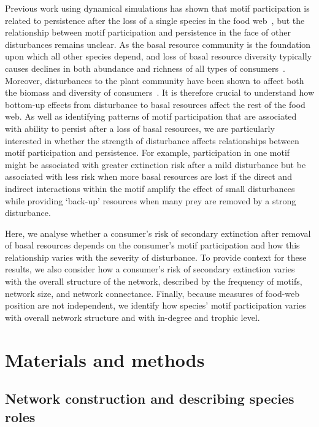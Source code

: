 \documentclass[12pt]{article}
\begin{document}
\begin{spacing}{2.0}
    Previous work using dynamical simulations has shown that motif participation is related to persistence after the loss of a single species in the food web~\citep{Cirtwill2022Oikos}, but the relationship between motif participation and persistence in the face of other disturbances remains unclear.
   As the basal resource community is the foundation upon which all other species depend, and loss of basal resource diversity typically causes declines in both abundance and richness of all types of consumers~\citep{scherber2010bottom,Dobson2009food,Georgiadis2007}.
    Moreover, disturbances to the plant community have been shown to affect both the biomass and diversity of consumers~\citep{chen2019plant,scherber2010bottom,li2020bottom}.
    It is therefore crucial to understand how bottom-up effects from disturbance to basal resources affect the rest of the food web.  
    As well as identifying patterns of motif participation that are associated with ability to persist after a loss of basal resources, we are particularly interested in whether the strength of  disturbance affects relationships between motif participation and persistence.
    For example, participation in one motif might be associated with greater extinction risk after a mild disturbance but be associated with less risk when more basal resources are lost if the direct and indirect interactions within the motif amplify the effect of small disturbances while providing `back-up' resources when many prey are removed by a strong disturbance.

        
    Here, we analyse whether a consumer's risk of secondary extinction after removal of basal resources depends on the consumer's motif participation and how this relationship varies with the severity of disturbance.
    To provide context for these results, we also consider how a consumer's risk of secondary extinction varies with the overall structure of the network, described by the frequency of motifs, network size, and network connectance.
    Finally, because measures of food-web position are not independent, we identify how species' motif participation varies with overall network structure and with in-degree and trophic level.


\section*{Materials and methods}

    \subsection*{Network construction and describing species roles}


\end{spacing}
\end{document}

